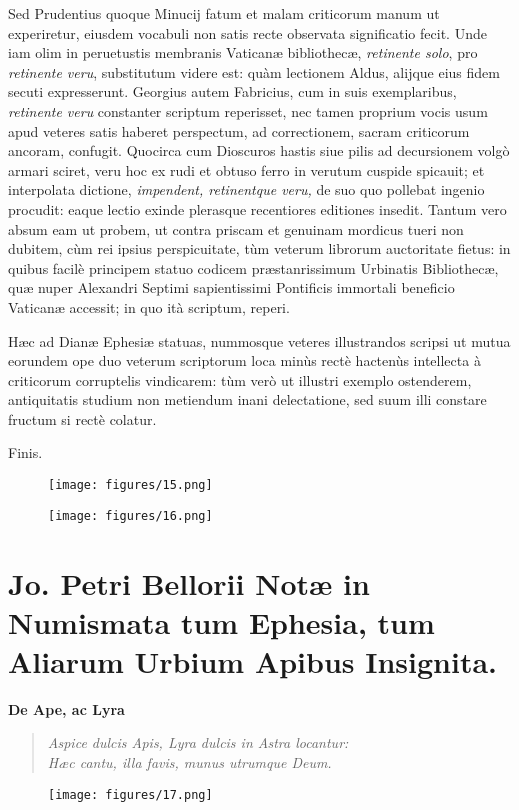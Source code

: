 \documentclass[a4paper, 11pt, oneside, polutonikogreek, latin]{article}
\begin{document}
Sed Prudentius quoque Minucij fatum et malam criticorum manum ut experiretur, eiusdem vocabuli non satis recte observata significatio fecit. Unde iam olim in peruetustis membranis Vaticanæ bibliothecæ, \emph{retinente solo}, pro \emph{retinente veru}, substitutum videre est: quàm lectionem Aldus, alijque eius fidem secuti expresserunt. Georgius autem Fabricius, cum in suis exemplaribus, \emph{retinente veru} constanter scriptum reperisset, nec tamen proprium vocis usum apud veteres satis haberet perspectum, ad correctionem, sacram criticorum ancoram, confugit. Quocirca cum Dioscuros hastis siue pilis ad decursionem volgò armari sciret, veru hoc ex rudi et obtuso ferro in verutum cuspide spicauit; et interpolata dictione, \emph{impendent, retinentque veru,} de suo quo pollebat ingenio procudit: eaque lectio exinde plerasque recentiores editiones insedit. Tantum vero absum eam ut probem, ut contra priscam et genuinam mordicus tueri non dubitem, cùm rei ipsius perspicuitate, tùm veterum librorum auctoritate fietus: in quibus facilè principem statuo codicem præstanrissimum Urbinatis Bibliothecæ, quæ nuper Alexandri Septimi sapientissimi Pontificis immortali beneficio Vaticanæ accessit; in quo ità scriptum, reperi.

Hæc ad Dianæ Ephesiæ statuas, nummosque veteres illustrandos scripsi ut mutua eorundem ope duo veterum scriptorum loca minùs rectè hactenùs intellecta à criticorum corruptelis vindicarem: tùm verò ut illustri exemplo ostenderem, antiquitatis studium non metiendum inani delectatione, sed suum illi constare fructum si rectè colatur.

Finis.
\clearpage
\vspace*{\fill}
\begin{figure}[H]
\centering
\texttt{[image: figures/15.png]}
\end{figure}
\vspace*{\fill}
\clearpage
\vspace*{\fill}
\begin{figure}[H]
\centering
\texttt{[image: figures/16.png]}
\end{figure}
\vspace*{\fill}
\clearpage
\section{Jo. Petri Bellorii Notæ in Numismata tum Ephesia, tum Aliarum Urbium Apibus Insignita.}
\begin{center}
\textbf{De Ape, ac Lyra}
\end{center}
\begin{quote}
\emph{Aspice dulcis Apis, Lyra dulcis in Astra locantur:}\\
\emph{Hæc cantu, illa favis, munus utrumque Deum.}\\
\end{quote}
\vspace*{\fill}
\begin{figure}[H]
\centering
\texttt{[image: figures/17.png]}
\end{figure}
\vspace*{\fill}
\clearpage
\end{document}
